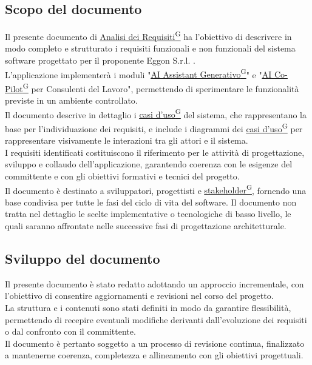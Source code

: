 ﻿\documentclass[a4paper,12pt]{article}
\providecommand{\glslink}[2]{\href{https://alittlebyte-19.github.io/Documentazione/glossario.html\#gls-#1}{\underline{#2}\textsuperscript{\scriptsize G}}}
\begin{document}
\subsection{Scopo del documento}
Il presente documento di \glslink{analisi-dei-requisiti-adr}{Analisi dei Requisiti} ha l'obiettivo di descrivere in modo completo e strutturato i requisiti funzionali e non funzionali del sistema software progettato per il proponente Eggon S.r.l. .\\
L'applicazione implementerà i moduli "\glslink{ai-assistant-generativo}{AI Assistant Generativo}" e "\glslink{ai-co-pilot-per-consulenti-del-lavoro-cdl}{AI Co-Pilot} per Consulenti del Lavoro", permettendo di sperimentare le funzionalità previste in un ambiente controllato.\\
Il documento descrive in dettaglio i \glslink{caso-d-uso-uc}{casi d'uso} del sistema, che rappresentano la base per l'individuazione dei requisiti, e include i diagrammi dei \glslink{caso-d-uso-uc}{casi d'uso} per rappresentare visivamente le interazioni tra gli attori e il sistema. \\
I requisiti identificati costituiscono il riferimento per le attività di progettazione, sviluppo e collaudo dell'applicazione, garantendo coerenza con le esigenze del committente e con gli obiettivi formativi e tecnici del progetto. \\
Il documento è destinato a sviluppatori, progettisti e \glslink{stakeholder}{stakeholder}, fornendo una base condivisa per tutte le fasi del ciclo di vita del software.
Il documento non tratta nel dettaglio le scelte implementative o tecnologiche di basso livello, le quali saranno affrontate nelle successive fasi di progettazione architetturale.

\subsection{Sviluppo del documento}
Il presente documento è stato redatto adottando un approccio incrementale, con l’obiettivo di consentire aggiornamenti e revisioni nel corso del progetto.\\
La struttura e i contenuti sono stati definiti in modo da garantire flessibilità, permettendo di recepire eventuali modifiche derivanti dall’evoluzione dei requisiti o dal confronto con il committente.\\
Il documento è pertanto soggetto a un processo di revisione continua, finalizzato a mantenerne coerenza, completezza e allineamento con gli obiettivi progettuali.
\end{document}
